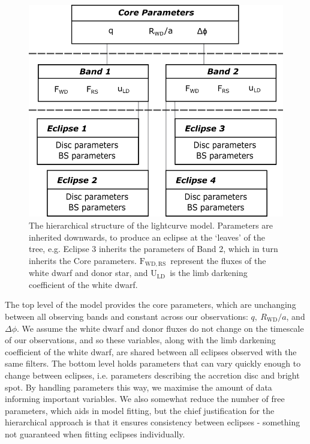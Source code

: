 \begin{figure}
    \centering
    \includegraphics[width=.85\columnwidth ]{figures/three_cvs_with_weird_colours/GeneralFigs/hierarchical_model_structure.png}
    \caption{The hierarchical structure of the lightcurve model. Parameters are inherited downwards, to produce an eclipse at the `leaves' of the tree, e.g. Eclipse 3 inherits the parameters of Band 2, which in turn inherits the Core parameters. $\mathrm{F_{WD, RS}}$\ represent the fluxes of the white dwarf and donor star, and $\mathrm{U_{LD}}$\ is the limb darkening coefficient of the white dwarf.}
    \label{fig:modelling:hierarchical_model}
\end{figure}

The top level of the model provides the core parameters, which are unchanging between all observing bands and constant across our observations: $q,\ R_\mathrm{WD}/a$, and $\Delta\phi$. We assume the white dwarf and donor fluxes do not change on the timescale of our observations, and so these variables, along with the limb darkening coefficient of the white dwarf, are shared between all eclipses observed with the same filters. The bottom level holds parameters that can vary quickly enough to change between eclipses, i.e. parameters describing the accretion disc and bright spot. By handling parameters this way, we maximise the amount of data informing important variables. We also somewhat reduce the number of free parameters, which aids in model fitting, but the chief justification for the hierarchical approach is that it ensures consistency between eclipses - something not guaranteed when fitting eclipses individually.



